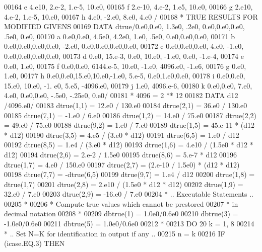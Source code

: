 \begin{DoxyCode}
00164      e          4.e10, 2.e-2, 1.e-5, 10.e0,
00165      f          2.e-10, 4.e-2, 1.e5, 10.e0,
00166      g          2.e10, 4.e-2, 1.e-5, 10.e0,
00167      h          4.e0, -2.e0, 8.e0, 4.e0    /
00168 \textcolor{comment}{*    TRUE RESULTS FOR MODIFIED GIVENS}
00169       \textcolor{keyword}{DATA} dtrue/0.e0,0.e0, 1.3e0, .2e0, 0.e0,0.e0,0.e0, .5e0, 0.e0,
00170      a           0.e0,0.e0, 4.5e0, 4.2e0, 1.e0, .5e0, 0.e0,0.e0,0.e0,
00171      b           0.e0,0.e0,0.e0,0.e0, -2.e0, 0.e0,0.e0,0.e0,0.e0,
00172      c           0.e0,0.e0,0.e0, 4.e0, -1.e0, 0.e0,0.e0,0.e0,0.e0,
00173      d           0.e0, 15.e-3, 0.e0, 10.e0, -1.e0, 0.e0, -1.e-4,
00174      e           0.e0, 1.e0,
00175      f           0.e0,0.e0, 6144.e-5, 10.e0, -1.e0, 4096.e0, -1.e6,
00176      g           0.e0, 1.e0,
00177      h           0.e0,0.e0,15.e0,10.e0,-1.e0, 5.e-5, 0.e0,1.e0,0.e0,
00178      i           0.e0,0.e0, 15.e0, 10.e0, -1. e0, 5.e5, -4096.e0,
00179      j           1.e0, 4096.e-6,
00180      k           0.e0,0.e0, 7.e0, 4.e0, 0.e0,0.e0, -.5e0, -.25e0, 0.e0/
00181 \textcolor{comment}{*                   4096 = 2 ** 12}
00182       \textcolor{keyword}{DATA} d12  /4096.e0/
00183       dtrue(1,1) = 12.e0 / 130.e0
00184       dtrue(2,1) = 36.e0 / 130.e0
00185       dtrue(7,1) = -1.e0 / 6.e0
00186       dtrue(1,2) = 14.e0 / 75.e0
00187       dtrue(2,2) = 49.e0 / 75.e0
00188       dtrue(9,2) = 1.e0 / 7.e0
00189       dtrue(1,5) = 45.e-11 * (d12 * d12)
00190       dtrue(3,5) = 4.e5 / (3.e0 * d12)
00191       dtrue(6,5) = 1.e0 / d12
00192       dtrue(8,5) = 1.e4 / (3.e0 * d12)
00193       dtrue(1,6) = 4.e10 / (1.5e0 * d12 * d12)
00194       dtrue(2,6) = 2.e-2 / 1.5e0
00195       dtrue(8,6) = 5.e-7 * d12
00196       dtrue(1,7) = 4.e0 / 150.e0
00197       dtrue(2,7) = (2.e-10 / 1.5e0) * (d12 * d12)
00198       dtrue(7,7) = -dtrue(6,5)
00199       dtrue(9,7) = 1.e4 / d12
00200       dtrue(1,8) = dtrue(1,7)
00201       dtrue(2,8) = 2.e10 / (1.5e0 * d12 * d12)
00202       dtrue(1,9) = 32.e0 / 7.e0
00203       dtrue(2,9) = -16.e0 / 7.e0
00204 \textcolor{comment}{*     .. Executable Statements ..}
00205 \textcolor{comment}{*}
00206 \textcolor{comment}{*     Compute true values which cannot be prestored}
00207 \textcolor{comment}{*     in decimal notation}
00208 \textcolor{comment}{*}
00209       dbtrue(1) = 1.0e0/0.6e0
00210       dbtrue(3) = -1.0e0/0.6e0
00211       dbtrue(5) = 1.0e0/0.6e0
00212 \textcolor{comment}{*}
00213       \textcolor{keywordflow}{DO} 20 k = 1, 8
00214 \textcolor{comment}{*        .. Set N=K for identification in output if any ..}
00215          n = k
00216          \textcolor{keywordflow}{IF} (icase.EQ.3) \textcolor{keywordflow}{THEN}

\end{DoxyCode}
